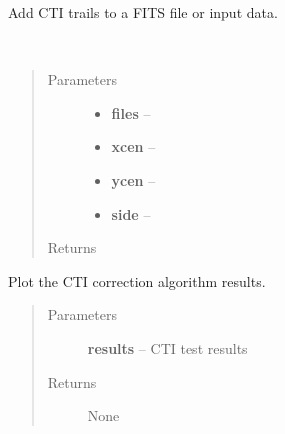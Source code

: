 \documentclass[a4paper,11pt,english]{sphinxmanual}
\begin{document}
\begin{fulllineitems}
\label{reduction:analysis.testCTIcorrection.addCTI}
Add CTI trails to a FITS file or input data.

\end{fulllineitems}


\begin{fulllineitems}
\label{reduction:analysis.testCTIcorrection.cutoutRegions}~\begin{quote}\begin{description}
\item[{Parameters}] \leavevmode\begin{itemize}
\item {} 
\textbf{files} -- 

\item {} 
\textbf{xcen} -- 

\item {} 
\textbf{ycen} -- 

\item {} 
\textbf{side} -- 

\end{itemize}

\item[{Returns}] \leavevmode


\end{description}\end{quote}

\end{fulllineitems}


\begin{fulllineitems}
\label{reduction:analysis.testCTIcorrection.plotResults}
Plot the CTI correction algorithm results.
\begin{quote}\begin{description}
\item[{Parameters}] \leavevmode
\textbf{results} -- CTI test results

\item[{Returns}] \leavevmode
None

\end{description}\end{quote}

\end{fulllineitems}
\end{document}
